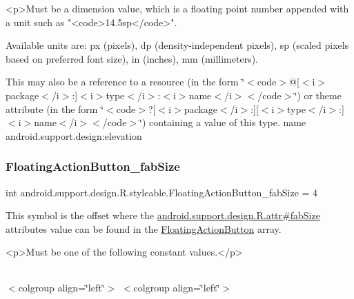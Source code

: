 \begin{DoxyVerb}      <p>Must be a dimension value, which is a floating point number appended with a unit such as "<code>14.5sp</code>".
\end{DoxyVerb}
 Available units are\+: px (pixels), dp (density-\/independent pixels), sp (scaled pixels based on preferred font size), in (inches), mm (millimeters). 

This may also be a reference to a resource (in the form \char`\"{}$<$code$>$@\mbox{[}$<$i$>$package$<$/i$>$\+:\mbox{]}$<$i$>$type$<$/i$>$\+:$<$i$>$name$<$/i$>$$<$/code$>$\char`\"{}) or theme attribute (in the form \char`\"{}$<$code$>$?\mbox{[}$<$i$>$package$<$/i$>$\+:\mbox{]}\mbox{[}$<$i$>$type$<$/i$>$\+:\mbox{]}$<$i$>$name$<$/i$>$$<$/code$>$\char`\"{}) containing a value of this type.  name android.\+support.\+design\+:elevation \mbox{\label{classandroid_1_1support_1_1design_1_1R_1_1styleable_ac636b36a3beebb7099949c4de633530e}} 
\subsubsection{\texorpdfstring{Floating\+Action\+Button\+\_\+fab\+Size}{FloatingActionButton\_fabSize}}
{\footnotesize\ttfamily int android.\+support.\+design.\+R.\+styleable.\+Floating\+Action\+Button\+\_\+fab\+Size = 4\hspace{0.3cm}{\ttfamily [static]}}

This symbol is the offset where the \hyperlink{classandroid_1_1support_1_1design_1_1R_1_1attr_a205255b0f0a29d2da84c1e91a3acf86b}{android.\+support.\+design.\+R.\+attr\#fab\+Size} attribute\textquotesingle{}s value can be found in the \hyperlink{classandroid_1_1support_1_1design_1_1R_1_1styleable_ac39eabec239d50ec950ae5f013825830}{Floating\+Action\+Button} array.

\begin{DoxyVerb}      <p>Must be one of the following constant values.</p>
\end{DoxyVerb}
 \tabulinesep=1mm
\begin{longtabu} spread 0pt [c]{*{0}{|X[-1]}|}
\hline
\end{longtabu}
$<$colgroup align=\char`\"{}left\char`\"{}$>$ $<$colgroup align=\char`\"{}left\char`\"{}$>$ 

